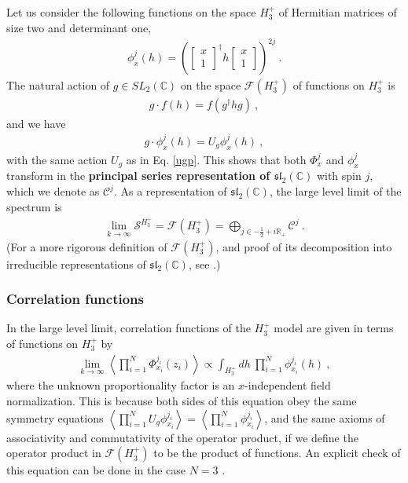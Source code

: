 \documentclass[12pt, a4paper, notitlepage, twoside]{report}
\numberwithin{equation}{section}
\theoremstyle{break}
\begin{document}
Let us consider the following functions on the space $H_3^+$ of Hermitian matrices of size two and determinant one,
\begin{align}
 \phi^j_{x}(h) = \left(\begin{bmatrix}
                                x \\ 1
                               \end{bmatrix}^\dagger 
h \begin{bmatrix}
   x \\ 1 
  \end{bmatrix}
 \right)^{2j}\ .
\end{align}
The natural action of $g\in SL_2({\mathbb{C}})$ on the space $\mathcal{F}(H_3^+)$ of functions on $H_3^+$ is
\begin{align}
 g\cdot f(h) = f(g^\dagger h g)\ ,
\end{align}
and we have 
\begin{align}
 g\cdot \phi^j_{x}(h) = U_g \phi^j_{x}(h)\ ,
\end{align}
with the same action $U_g$ as in Eq. \eqref{ugp}.
This shows that both $\Phi^j_x$ and $\phi^j_x$ transform in the \textbf{\boldmath principal series representation of $\mathfrak{sl}_2({\mathbb{C}})$} with spin $j$, which we denote as $\mathcal{C}^j$. 
As a representation of $\mathfrak{sl}_2({\mathbb{C}})$, the large level limit of the spectrum is 
\begin{align}
 \underset{k\to\infty}{\lim} \mathcal{S}^{H_3^+} =  \mathcal{F}(H_3^+) = \bigoplus_{j\in -\frac12+i{\mathbb{R}}_+} \mathcal{C}^j\ .
\end{align}
(For a more rigorous definition of $\mathcal{F}(H_3^+)$, and proof of its decomposition into irreducible representations of $\mathfrak{sl}_2({\mathbb{C}})$, see \cite{tes97b}.)


\subsubsection{Correlation functions}

In the large level limit, correlation functions of the $H_3^+$ model are given in terms of functions on $H_3^+$ by 
\begin{align}
 \underset{k\to \infty}{\lim} \left\langle \prod_{i=1}^N \Phi^{j_i}_{x_i}(z_i)\right\rangle \propto \int_{H_3^+} dh\ \prod_{i=1}^N \phi^{j_i}_{x_i}(h)\ , 
\end{align}
where the unknown proportionality factor is an $x$-independent field normalization.
This is because both sides of this equation obey the same symmetry equations $\left<\prod_{i=1}^N U_g \phi^{j_i}_{x_i} \right> = \left<\prod_{i=1}^N \phi^{j_i}_{x_i} \right>$, and the same axioms of associativity and commutativity of the operator product, if we define the operator product in $\mathcal{F}(H_3^+)$ to be the product of functions. 
An explicit check of this equation can be done in the case $N=3$ \cite{tes97b}.
\end{document}
